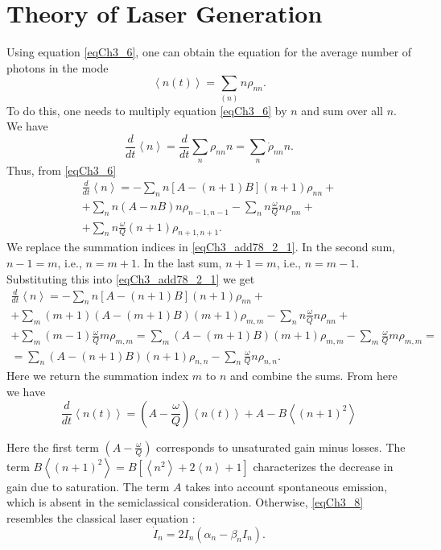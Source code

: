 \section{Theory of Laser Generation}
Using equation \eqref{eqCh3_6}, one can obtain the equation for the average number of photons in the mode 
\[
\left<n\left(t\right)\right> =\sum_{(n)}n\rho_{nn}.
\]
To do this, one needs to multiply equation \eqref{eqCh3_6} by $n$ and sum over all $n$. We have
\[
\frac{d}{dt}\left<n\right> = \frac{d}{dt}\sum_n\rho_{nn}n = 
\sum_n\dot{\rho}_{nn}n.
\]
Thus, from \eqref{eqCh3_6}
\begin{eqnarray}
\frac{d}{dt}\left<n\right> = 
-\sum_n n \left[A - \left(n + 1\right)B\right]\left(n + 1\right)\rho_{nn} +
\nonumber \\
+ \sum_n n\left(A - n B\right)n \rho_{n - 1, n - 1} 
- \sum_n n\frac{\omega}{Q}n \rho_{nn} + 
\nonumber \\
+ \sum_n n \frac{\omega}{Q} \left(n + 1\right)\rho_{n + 1, n + 1}.
\label{eqCh3_add78_2_1}
\end{eqnarray}
We replace the summation indices in \eqref{eqCh3_add78_2_1}. In the second sum, $n - 1 = m$, i.e., $n = m + 1$. In the last sum, $n + 1 = m$, i.e., $n = m - 1$. Substituting this into \eqref{eqCh3_add78_2_1} we get
\begin{eqnarray}
\frac{d}{dt}\left<n\right>  = 
-\sum_n n \left[A - \left(n + 1\right)B\right]\left(n + 1\right)\rho_{nn} +
\nonumber \\
+ \sum_m \left(m + 1\right)\left(A - \left(m + 1\right)B\right)\left(m + 1\right) \rho_{m, m} 
- \sum_n n\frac{\omega}{Q}n \rho_{nn} + 
\nonumber \\
+ \sum_m \left(m - 1\right) \frac{\omega}{Q} m\rho_{m, m} = 
\sum_m \left(A - \left(m + 1\right) B\right)\left(m + 1\right) \rho_{m, m} - 
\sum_m \frac{\omega}{Q} m\rho_{m, m} = 
\nonumber \\
= \sum_n \left(A - \left(n + 1\right) B\right)\left(n + 1\right) \rho_{n, n} - 
\sum_n \frac{\omega}{Q} n\rho_{n, n}.
\nonumber
\end{eqnarray}
Here we return the summation index $m$ to $n$ and combine the sums. From here we have
\begin{equation}
\frac{d}{d t}\left<n\left(t\right)\right> = 
\left(A - \frac{\omega}{Q}\right)\left<n\left(t\right)\right>
+ A - B \left<\left(n + 1\right)^2\right>
\label{eqCh3_8}
\end{equation}

Here the first term $\left(A - \frac{\omega}{Q}\right)$ corresponds to unsaturated gain minus losses. The term 
$B\left<\left(n + 1\right)^2\right> = B \left[\left<n^2\right> + 2
  \left<n\right> + 1\right]$ 
characterizes the decrease in gain due to saturation. The term $A$ takes into account spontaneous emission, which is absent in the semiclassical consideration. Otherwise, \eqref{eqCh3_8} resembles the classical laser equation \cite{bQuantumOpticsAndRadioPhisicsLecture1966}:
\[
\dot{I}_n = 2 I_n\left(\alpha_n - \beta_n I_n\right).
\]
